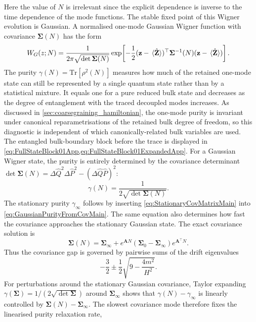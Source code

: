 \documentclass{article}
\def\Tr{\mathrm{Tr}}
\numberwithin{equation}{section}
\begin{document}
	Here the value of $N$ is irrelevant since the explicit dependence is inverse to the time dependence of the mode functions. The stable fixed point of this Wigner evolution is Gaussian. A normalised one-mode Gaussian Wigner function with covariance \(\mathbf{\Sigma}(N)\) has the form
	\begin{equation}
		W_G(z;N) = \frac{1}{2\pi\sqrt{\det\mathbf{\Sigma}(N)}} \exp\!\left[ -\frac12(\mathbf{z}-\ev*{\hat{\mathbf{Z}}})^\top\mathbf{\mathbf{\Sigma}}^{-1}(N)(\mathbf{z}-\ev*{\hat{\mathbf{Z}}}) \right].
	\end{equation}
	The purity \(\gamma(N)=\Tr[\rho^2(N)]\) measures how much of the retained one-mode state can still be represented by a single quantum state rather than by a statistical mixture. It equals one for a pure reduced bulk state and decreases as the degree of entanglement with the traced decoupled modes increases. As discussed in \cref{sec:coarsegraining_hamiltonian}, the one-mode purity is invariant under canonical reparametrisations of the retained bulk degree of freedom, so this diagnostic is independent of which canonically-related bulk variables are used. The entangled bulk-boundary block before the trace is displayed in \cref{eq:FullStateBlock01App,eq:FullStateBlock01ExpandedApp}. For a Gaussian Wigner state, the purity is entirely determined by the covariance determinant \(\det\mathbf{\Sigma}(N) = \Delta \hat{Q}^2 \Delta \hat{P}^2 - (\Delta \hat{Q}\hat{P})^2\):
	\begin{equation}
		\gamma(N) = \frac{1}{2\sqrt{\det\mathbf{\Sigma}(N)}} .
		\label{eq:GaussianPurityFromCovMain}
	\end{equation}
	The stationary purity \(\gamma_\infty\) follows by inserting \cref{eq:StationaryCovMatrixMain} into \cref{eq:GaussianPurityFromCovMain}. The same equation also determines how fast the covariance approaches the stationary Gaussian state. The exact covariance solution is
	\begin{equation}
		\mathbf{\Sigma}(N)=\mathbf{\Sigma}_\infty+e^{\mathbf{A}N}\left(\mathbf{\Sigma}_0-\mathbf{\Sigma}_\infty\right)e^{\mathbf{A}^\top N}.
		\label{eq:CovRelaxationMain}
	\end{equation}
	Thus the covariance gap is governed by pairwise sums of the drift eigenvalues
	\begin{equation}
		-\frac32\pm\frac12\sqrt{9-\frac{4m^2}{H^2}} .
		\label{eq:CovGapExponentsMain}
	\end{equation}
	For perturbations around the stationary Gaussian covariance, Taylor expanding \(\gamma(\mathbf{\Sigma})=1/(2\sqrt{\det \mathbf{\Sigma}})\) around \(\mathbf{\Sigma}_\infty\) shows that \(\gamma(N)-\gamma_\infty\) is linearly controlled by \(\mathbf{\Sigma}(N)-\mathbf{\Sigma}_\infty\). The slowest covariance mode therefore fixes the linearised purity relaxation rate,
\end{document}
